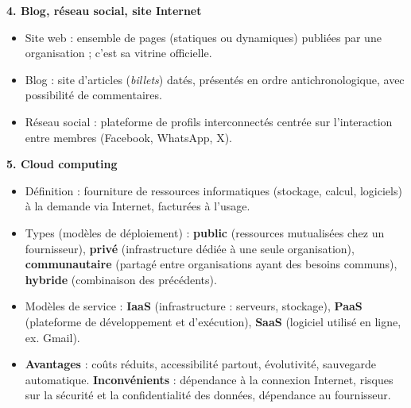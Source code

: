 \documentclass[11pt]{article}
\newcommand{\cle}[1]{{\popxbold\color{popdark}#1}}
\begin{document}
\begin{aretenir}[L'essentiel de la le\c{c}on]
\textbf{4. Blog, r\'eseau social, site Internet}
\begin{itemize}
  \item \cle{Site web} : ensemble de pages (statiques ou dynamiques) publi\'ees par une organisation ; c'est sa vitrine officielle.
  \item \cle{Blog} : site d'articles (\emph{billets}) dat\'es, pr\'esent\'es en ordre antichronologique, avec possibilit\'e de commentaires.
  \item \cle{R\'eseau social} : plateforme de profils interconnect\'es centr\'ee sur l'interaction entre membres (Facebook, WhatsApp, X).
\end{itemize}

\textbf{5. Cloud computing}
\begin{itemize}
  \item \cle{D\'efinition} : fourniture de ressources informatiques (stockage, calcul, logiciels) \`a la demande via Internet, factur\'ees \`a l'usage.
  \item \cle{Types (mod\`eles de d\'eploiement)} : \textbf{public} (ressources mutualis\'ees chez un fournisseur), \textbf{priv\'e} (infrastructure d\'edi\'ee \`a une seule organisation), \textbf{communautaire} (partag\'e entre organisations ayant des besoins communs), \textbf{hybride} (combinaison des pr\'ec\'edents).
  \item \cle{Mod\`eles de service} : \textbf{IaaS} (infrastructure : serveurs, stockage), \textbf{PaaS} (plateforme de d\'eveloppement et d'ex\'ecution), \textbf{SaaS} (logiciel utilis\'e en ligne, ex. Gmail).
  \item \textbf{Avantages} : co\^uts r\'eduits, accessibilit\'e partout, \'evolutivit\'e, sauvegarde automatique. \textbf{Inconv\'enients} : d\'ependance \`a la connexion Internet, risques sur la s\'ecurit\'e et la confidentialit\'e des donn\'ees, d\'ependance au fournisseur.
\end{itemize}
\end{aretenir}
\end{document}
